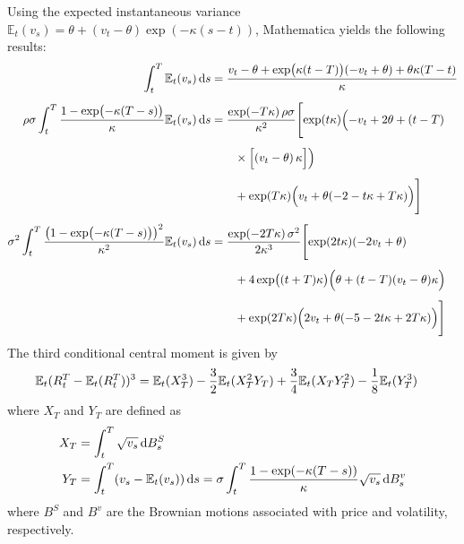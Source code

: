 Using the expected instantaneous variance $\mathbb{E}_t(v_s) = \theta + (v_t - \theta)\exp(-\kappa(s-t))$, Mathematica yields the following results:
\begin{align}
    \int_t^T \mathbb{E}_t(v_s)\,\mathrm{d}s 
    &= \frac{v_t - \theta + \exp\bigl(\kappa(t-T)\bigr)(-v_t+\theta) + \theta\kappa(T - t)}{\kappa} \notag \\[1ex]
    \rho\sigma\int_t^T \frac{1-\exp\bigl(-\kappa(T-s)\bigr)}{\kappa}\mathbb{E}_t(v_s)\,\mathrm{d}s 
    &= \frac{\exp(-T\kappa)\,\rho\sigma}{\kappa^2} \Biggl[
        \exp(t\kappa)\Bigl(-v_t+2\theta+(t-T)
        \notag\\[1ex]
    &\quad\quad\times \Bigl[(v_t-\theta)\,\kappa\Bigr]\Bigr) \notag\\[1ex]
    &\quad\quad + \exp(T\kappa)\Bigl(v_t+\theta(-2-t\kappa+T\kappa)\Bigr)
    \Biggr] \notag \\[1ex]
    \sigma^2\int_t^T\frac{\bigl(1-\exp\bigl(-\kappa(T-s)\bigr)\bigr)^2}{\kappa^2}\mathbb{E}_t(v_s) \,\mathrm{d}s 
    &= \frac{\exp(-2T\kappa)\,\sigma^2}{2\kappa^3} \Biggl[
        \exp(2t\kappa)(-2v_t+\theta) \notag\\[1ex]
    &\quad\quad + 4\exp\bigl((t+T)\kappa\bigr)\Bigl(\theta+(t-T)(v_t-\theta)\kappa\Bigr) \notag\\[1ex]
    &\quad\quad + \exp(2T\kappa)\Bigl(2v_t+\theta(-5-2t\kappa+2T\kappa)\Bigr)
    \Biggr] \notag
\end{align}
The third conditional central moment is given by
\begin{align}
    \mathbb{E}_t(R_t^T-\mathbb{E}_t(R_t^T))^3 &= \mathbb{E}_t(X_T^3) - \frac{3}{2}\mathbb{E}_t(X_T^2Y_T) + \frac{3}{4}\mathbb{E}_t(X_TY_T^2) - \frac{1}{8}\mathbb{E}_t(Y_T^3) \notag
\end{align}
where $X_T$ and $Y_T$ are defined as
\begin{align}
    X_T &= \int_t^T \sqrt{v_s}\,\mathrm{d}B_s^S \notag \\
    Y_T &= \int_t^T (v_s - \mathbb{E}_t(v_s))\,\mathrm{d}s = \sigma\int_t^T\frac{1-\exp(-\kappa(T-s))}{\kappa}\sqrt{v_s}\,\mathrm{d}B_s^v \notag
\end{align}
where $B^S$ and $B^v$ are the Brownian motions associated with price and volatility, respectively.

